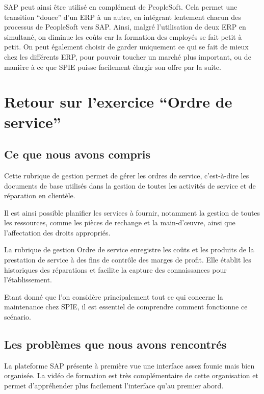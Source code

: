 SAP peut ainsi être utilisé en complément de PeopleSoft. Cela permet une transition “douce” d’un ERP à un autre, en intégrant lentement chacun des processus de PeopleSoft vers SAP. Ainsi, malgré l’utilisation de deux ERP en simultané, on diminue les coûts car la formation des employés se fait petit à petit. On peut également choisir de garder uniquement ce qui se fait de mieux chez les différents ERP, pour pouvoir toucher un marché plus important, ou de manière à ce que SPIE puisse facilement élargir son offre par la suite.


\section{Retour sur l’exercice “Ordre de service”}

\subsection{Ce que nous avons compris}

Cette rubrique de gestion permet de gérer les ordres de service, c’est-à-dire les documents de base utilisés dans la gestion de toutes les activités de service et de réparation en clientèle. 

Il est ainsi possible planifier les services à fournir, notamment la gestion de toutes les ressources, comme les pièces de rechange et la main-d'œuvre, ainsi que l'affectation des droits appropriés. 

La rubrique de gestion Ordre de service enregistre les coûts et les produits de la prestation de service à des fins de contrôle des marges de profit. Elle établit les historiques des réparations et facilite la capture des connaissances pour l'établissement.

Etant donné que l’on considère principalement tout ce qui concerne la maintenance chez SPIE, il est essentiel de comprendre comment fonctionne ce scénario.

\subsection{Les problèmes que nous avons rencontrés}

La plateforme SAP présente à première vue une interface assez founie mais bien organisée. La vidéo de formation est très complémentaire de cette organisation et permet d'appréhender plus facilement l'interface qu'au premier abord.



